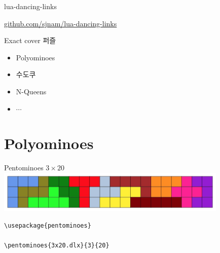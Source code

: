 \documentclass{beamer}
\begin{document}
%

%
\begin{frame}{lua-dancing-links}
\vfill
\begin{center}
\Large
  \href{https://github.com/sjnam/lua-dancing-links}
    {github.com/sjnam/lua-dancing-links}
\end{center}
\vfill
\end{frame}

%
\begin{frame}{Exact cover 퍼즐}
  \begin{itemize}
  \item Polyominoes
  \item 수도쿠
  \item N-Queens
  \item $\cdots$
  \end{itemize}
\end{frame}


\section{Polyominoes}

%

%
\begin{frame}[fragile]{Pentominoes $3\times20$}
\centering\includegraphics[height=2cm]{3x20.jpg}
\begin{verbatim}
\usepackage{pentominoes}

\pentominoes{3x20.dlx}{3}{20}
\end{verbatim}  
\end{frame}
\end{document}
